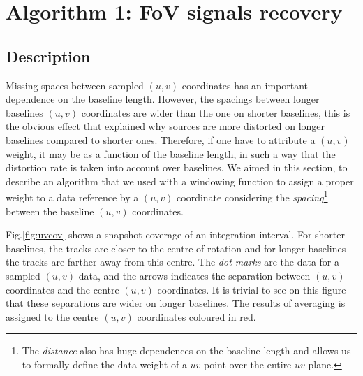 \documentclass[useAMS,usenatbib]{mn2e}
\begin{document}
\section{Algorithm 1: FoV signals recovery}
\label{baseline1}
\subsection{Description}
Missing spaces between sampled $(u,v)$ coordinates has an important dependence on the baseline length. However, the spacings between longer 
baselines $(u,v)$ coordinates are wider than the one on shorter baselines, this is the obvious effect that explained why sources are more 
distorted on longer baselines compared to shorter ones. Therefore, if one have to attribute a $(u,v)$ weight, it may be as a function of 
the baseline length, in such a way that the distortion rate is taken into account over baselines. We aimed in this section, to 
describe an algorithm that we used with a  windowing function to assign a proper weight to a data reference by a $(u,v)$ 
coordinate considering the \textit{spacing}\footnote{The \textit{distance} also has huge 
dependences on the baseline length and allows us to formally define the data
weight of a $uv$ point over the entire $uv$ plane.} between the baseline $(u,v)$ coordinates.

Fig.\ref{fig:uvcov} shows a snapshot coverage of an integration interval. For shorter baselines, the tracks are closer to the centre of 
rotation and for longer baselines the tracks are farther away from this centre. The \textit{dot marks} are the data for a sampled $(u,v)$ 
data, and the  arrows indicates the separation between $(u,v)$ coordinates and the centre $(u,v)$ coordinates. It is trivial to see on this 
figure that these separations are wider on longer baselines. The results of averaging is assigned to the centre $(u,v)$ coordinates 
coloured 
in red. 
\end{document}
